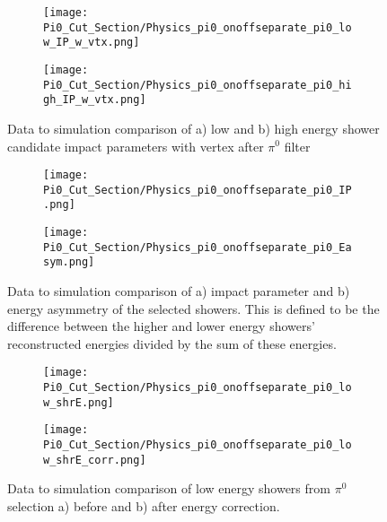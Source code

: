 \begin{figure}[H]
\centering
  \begin{subfigure}[t]{0.3\textwidth}
    \centering
\texttt{[image: Pi0\_Cut\_Section/Physics\_pi0\_onoffseparate\_pi0\_low\_IP\_w\_vtx.png]}
  \caption{ }
  \end{subfigure} 
  \hspace{30mm}
  \begin{subfigure}[t]{0.3\textwidth}
    \centering
\texttt{[image: Pi0\_Cut\_Section/Physics\_pi0\_onoffseparate\_pi0\_high\_IP\_w\_vtx.png]}
  \caption{ }
  \end{subfigure} 
\label{fig:physics_pi0_pi0_IP_w_vtx}
\caption{ Data to simulation comparison of a) low and b) high energy shower candidate impact parameters with vertex after $\pi^0$ filter }
\end{figure}

\begin{figure}[H]
\centering
  \begin{subfigure}[t]{0.3\textwidth}
    \centering
\texttt{[image: Pi0\_Cut\_Section/Physics\_pi0\_onoffseparate\_pi0\_IP.png]}
  \caption{ }
  \end{subfigure} 
  \hspace{30mm}
  \begin{subfigure}[t]{0.3\textwidth}
    \centering
\texttt{[image: Pi0\_Cut\_Section/Physics\_pi0\_onoffseparate\_pi0\_Easym.png]}
  \caption{ }
  \end{subfigure} 
\label{fig:physics_pi0_pi0_IP}
\caption{ Data to simulation comparison of a) impact parameter and b) energy asymmetry of the selected showers. This is defined to be the difference between the higher and lower energy showers' reconstructed energies divided by the sum of these energies. }
\end{figure}

\begin{figure}[H]
\centering
  \begin{subfigure}[t]{0.3\textwidth}
    \centering
\texttt{[image: Pi0\_Cut\_Section/Physics\_pi0\_onoffseparate\_pi0\_low\_shrE.png]}
  \caption{ }
  \end{subfigure} 
  \hspace{30mm}
  \begin{subfigure}[t]{0.3\textwidth}
    \centering
\texttt{[image: Pi0\_Cut\_Section/Physics\_pi0\_onoffseparate\_pi0\_low\_shrE\_corr.png]}
  \caption{ }
  \end{subfigure} 
\label{fig:physics_pi0_pi0_low_e}
\caption{  Data to simulation comparison of low energy showers from $\pi^0$ selection a) before and b) after energy correction.}
\end{figure}

